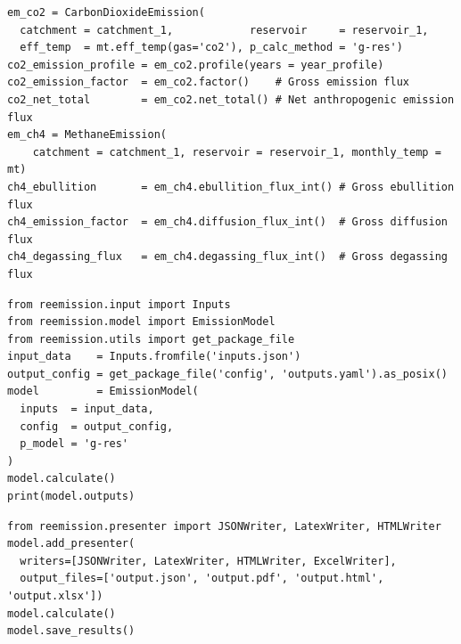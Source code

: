 \documentclass[final,1p,times]{elsarticle}
\begin{document}
\begin{minipage}{\linewidth}
\begin{lstlisting}[language=PythonReemission, label={lst:em_calc}, caption={Use of Re-Emission as a library: calculation of CO$_2$ and CH$_4$ emissions using \texttt{CarbonDioxideEmission} and \texttt{MethaneEmission} classes.}]
em_co2 = CarbonDioxideEmission(
  catchment = catchment_1,            reservoir     = reservoir_1,
  eff_temp  = mt.eff_temp(gas='co2'), p_calc_method = 'g-res')
co2_emission_profile = em_co2.profile(years = year_profile)
co2_emission_factor  = em_co2.factor()    # Gross emission flux
co2_net_total        = em_co2.net_total() # Net anthropogenic emission flux
em_ch4 = MethaneEmission(
	catchment = catchment_1, reservoir = reservoir_1, monthly_temp = mt)
ch4_ebullition       = em_ch4.ebullition_flux_int() # Gross ebullition flux
ch4_emission_factor  = em_ch4.diffusion_flux_int()  # Gross diffusion flux
ch4_degassing_flux   = em_ch4.degassing_flux_int()  # Gross degassing flux
\end{lstlisting}
\end{minipage}

\begin{minipage}{\linewidth}
\begin{lstlisting}[language=PythonReemission, label={lst:em_calc_file}, caption={Use of Re-Emission as a library: calculation of reservoir emissions with inputs read from file using the \texttt{Input} class.}]
from reemission.input import Inputs
from reemission.model import EmissionModel
from reemission.utils import get_package_file
input_data    = Inputs.fromfile('inputs.json')
output_config = get_package_file('config', 'outputs.yaml').as_posix()
model         = EmissionModel(
  inputs  = input_data, 
  config  = output_config, 
  p_model = 'g-res'
)
model.calculate()
print(model.outputs)
\end{lstlisting}
\end{minipage}

\begin{minipage}{\linewidth}
\begin{lstlisting}[language=PythonReemission, label={lst:em_calc_presentation}, caption={Use of Re-Emission as a library: saving results in multiple file formats using the \texttt{Presenter} and \texttt{Writer} classes.}]
from reemission.presenter import JSONWriter, LatexWriter, HTMLWriter
model.add_presenter(
  writers=[JSONWriter, LatexWriter, HTMLWriter, ExcelWriter],
  output_files=['output.json', 'output.pdf', 'output.html', 'output.xlsx'])
model.calculate()
model.save_results()
\end{lstlisting}
\end{minipage}
\end{document}
